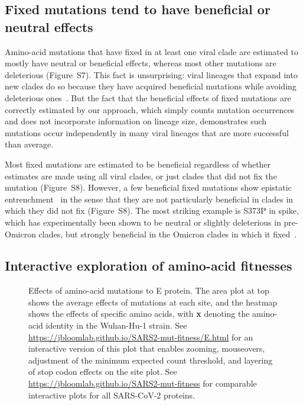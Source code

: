 \documentclass[9pt,twocolumn,twoside]{gsajnl_modified}
\begin{document}
\subsection*{Fixed mutations tend to have beneficial or neutral effects}
Amino-acid mutations that have fixed in at least one viral clade are estimated to mostly have neutral or beneficial effects, whereas most other mutations are deleterious (Figure~S7).
This fact is unsurprising: viral lineages that expand into new clades do so because they have acquired beneficial mutations while avoiding deleterious ones~\citep{luksza2014predictive, koelle2015effects, huddleston2020integrating}.
But the fact that the beneficial effects of fixed mutations are correctly estimated by our approach, which simply counts mutation occurrences and does not incorporate information on lineage size, demonstrates such mutations occur independently in many viral lineages that are more successful than average.

Most fixed mutations are estimated to be beneficial regardless of whether estimates are made using all viral clades, or just clades that did not fix the mutation (Figure~S8).
However, a few beneficial fixed mutations show epistatic entrenchment~\citep{shah2015contingency, starr2018pervasive} in the sense that they are not particularly beneficial in clades in which they did not fix (Figure~S8).
The most striking example is S373P in spike, which has experimentally been shown to be neutral or slightly deleterious in pre-Omicron clades, but strongly beneficial in the Omicron clades in which it fixed~\citep{starr2022deep, moulana2022compensatory}.

\subsection*{Interactive exploration of amino-acid fitnesses}

\begin{figure*}
\caption{
Effects of amino-acid mutations to E protein.
The area plot at top shows the average effects of mutations at each site, and the heatmap shows the effects of specific amino acids, with \textbf{x} denoting the amino-acid identity in the Wuhan-Hu-1 strain.
See \url{https://jbloomlab.github.io/SARS2-mut-fitness/E.html} for an interactive version of this plot that enables zooming, mouseovers, adjustment of the minimum expected count threshold, and layering of stop codon effects on the site plot.
See \url{https://jbloomlab.github.io/SARS2-mut-fitness} for comparable interactive plots for all SARS-CoV-2 proteins.
\label{fig:E_heatmap}
}
\end{figure*}
\end{document}
